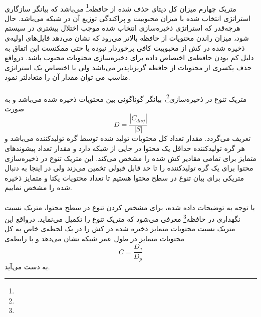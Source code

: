 \paragraph{}
متریک چهارم میزان کل دیتای حذف شده از حافظه\footnote{} می‌باشد که بیانگر سازگاری استراتژی انتخاب شده با میزان محبوبیت و پراکندگی توزیع آن در شبکه می‌باشد. حال هرچه‌قدر که استراتژی ذخیره‌سازی انتخاب شده موجب اختلال بیشتری در سیستم شود، میزان راندن محتویات از حافظه بالاتر می‌رود که نشان می‌دهد فایل‌های اولیه‌ی ذخیره شده در کش از محبوبیت کافی برخوردار نبوده یا حتی ممکنست این اتفاق به دلیل کم بودن حافظه‌ی اختصاص داده برای ذخیره‌سازی محتویات محبوب باشد. درواقع حذف یکسری از محتویات از حافظه گریزناپذیر می‌باشد ولی با اختصاص یک استراتژی مناسب می توان مقدار آن را متعادلتر نمود.

\paragraph{}
متریک تنوع در ذخیره‌سازی\footnote{}، بیانگر گوناگونی بین محتویات ذخیره شده می‌باشد و به صورت 
\begin{equation}\label{eq1}
	D = \frac{|C_{disj}|}{|S|}
\end{equation}
تعریف می‌گردد. مقدار  تعداد کل محتویات تولید شده توسط گره تولیدکننده می‌باشد و هر گره تولیدکننده حداقل یک محتوا در جایی از شبکه دارد و مقدار 
تعداد پیشوندهای متمایز برای تمامی مقادیر کش شده را مشخص می‌کند. این متریک تنوع در ذخیره‌سازی محتوا برای یک گره تولیدکننده را تا حد قابل قبولی تخمین می‌زند ولی در اینجا به دنبال متریکی برای بیان تنوع در سطح محتوا هستیم تا تعداد محتویات یکتا  و متمایز ذخیره شده را مشخص نماییم.

\paragraph{}
با توجه به توضیحات داده شده، برای مشخص کردن تنوع در سطح محتوا، متریک  نسبت نگهداری در حافظه\footnote{} معرفی می‌شود که متریک تنوع را تکمیل می‌نماید. درواقع این متریک نسبت محتویات متمایز ذخیره شده در کش را در یک لحظه‌ی خاص به کل محتویات متمایز در طول عمر شبکه نشان می‌دهد و با رابطه‌ی 
\begin{equation}\label{eq1}
	C = \frac{D_q}{D_p}
\end{equation}
به دست می‌آید. 

